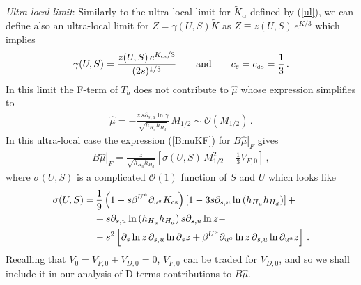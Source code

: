 \documentclass[12pt,a4paper]{book}
\def\nn{\nonumber}
\def\nn{\nonumber}
\def\dS{{\scriptscriptstyle \rm dS}}
\newcommand{\mc}{\mathcal}
\begin{document}
\medskip
\emph{Ultra-local limit}: Similarly to the ultra-local limit for $\tilde{K}_\alpha$ defined by (\ref{ul}), we can define also an ultra-local limit for $Z=\gamma(U,S)\tilde{K}$ as $Z\equiv z(U,S)\,e^{K/3}$ which implies
\begin{align}
\label{fdef2}
\gamma(U,S) = \frac{z(U,S)\,e^{K_{\rm cs}/3}}{(2s)^{1/3}}\qquad \text{and}\qquad c_s=c_\dS=\frac 13\,.
\end{align}
In this limit the F-term of $T_b$ does not contribute to $\hat\mu$ whose expression simplifies to
\begin{align}
\label{mu2}
\hat\mu  =  - \frac{z\,s\partial_{s,u} \ln\gamma}{\sqrt{h_{H_u } h_{H_d}}}\,M_{1/2}\sim\mc{O}\left(M_{1/2}\right)\, .
\end{align}
In this ultra-local case the expression (\ref{BmuKF}) for $\left.B\hat\mu\right|_F$ gives
\begin{align}
\left.B\hat\mu\right|_F = \frac{z}{\sqrt{h_{H_u } h_{H_d}}}\left[\sigma(U,S) \,M_{1/2}^2-\frac 13 V_{F,0}\right]\,,
\label{Bmu2}
\end{align}
where $\sigma(U,S)$ is a complicated $\mc{O}(1)$ function of $S$ and $U$ which looks like
\begin{align}
\sigma(U,S) =&\, \frac 19 \left(1-s\beta^{U^a}\partial_{u^a}K_{\rm cs} \right)
\left[1 - 3 s \partial_{s,u} \ln \left(h_{H_u} h_{H_d}\right)\right] + \nonumber \\
&+ s \partial_{s,u} \ln \left(h_{H_u} h_{H_d}\right) s \partial_{s,u}\ln z- \nn \\
&- s^2\left[\partial_s \ln z \,\partial_{s,u} \ln \partial_s z +\beta^{U^a} \partial_{u^a} \ln z \,\partial_{s,u} \ln \partial_{u^a} z\right]\,. \nonumber
\end{align}
Recalling that $V_0 = V_{F,0} + V_{D,0}=0$, $V_{F,0}$ can be traded for $V_{D,0}$, and so we shall include it in our analysis of D-terms contributions to $B\hat\mu$.
\end{document}
